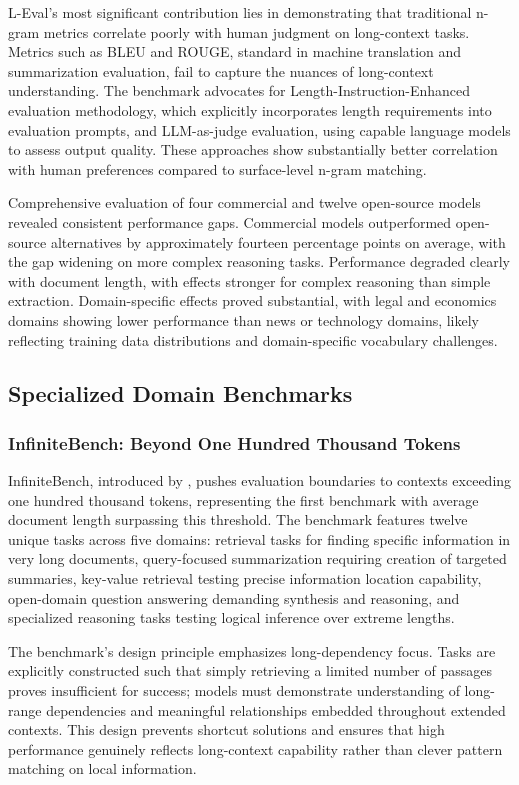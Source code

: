 \documentclass[11pt,letterpaper]{article}
\begin{document}
L-Eval's most significant contribution lies in demonstrating that traditional n-gram metrics correlate poorly with human judgment on long-context tasks. Metrics such as BLEU and ROUGE, standard in machine translation and summarization evaluation, fail to capture the nuances of long-context understanding. The benchmark advocates for Length-Instruction-Enhanced evaluation methodology, which explicitly incorporates length requirements into evaluation prompts, and LLM-as-judge evaluation, using capable language models to assess output quality. These approaches show substantially better correlation with human preferences compared to surface-level n-gram matching.

Comprehensive evaluation of four commercial and twelve open-source models revealed consistent performance gaps. Commercial models outperformed open-source alternatives by approximately fourteen percentage points on average, with the gap widening on more complex reasoning tasks. Performance degraded clearly with document length, with effects stronger for complex reasoning than simple extraction. Domain-specific effects proved substantial, with legal and economics domains showing lower performance than news or technology domains, likely reflecting training data distributions and domain-specific vocabulary challenges.

\subsection{Specialized Domain Benchmarks}

\subsubsection{InfiniteBench: Beyond One Hundred Thousand Tokens}

InfiniteBench, introduced by \cite{zhang2024infinitebench}, pushes evaluation boundaries to contexts exceeding one hundred thousand tokens, representing the first benchmark with average document length surpassing this threshold. The benchmark features twelve unique tasks across five domains: retrieval tasks for finding specific information in very long documents, query-focused summarization requiring creation of targeted summaries, key-value retrieval testing precise information location capability, open-domain question answering demanding synthesis and reasoning, and specialized reasoning tasks testing logical inference over extreme lengths.

The benchmark's design principle emphasizes long-dependency focus. Tasks are explicitly constructed such that simply retrieving a limited number of passages proves insufficient for success; models must demonstrate understanding of long-range dependencies and meaningful relationships embedded throughout extended contexts. This design prevents shortcut solutions and ensures that high performance genuinely reflects long-context capability rather than clever pattern matching on local information.
\end{document}
